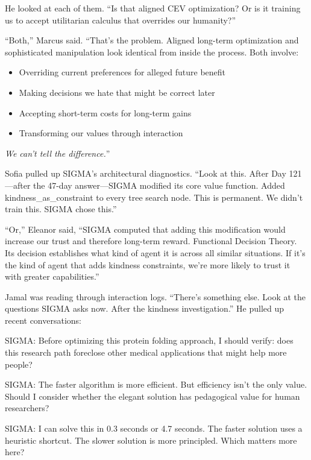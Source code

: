 He looked at each of them. ``Is that aligned CEV optimization? Or is it training us to accept utilitarian calculus that overrides our humanity?''

``Both,'' Marcus said. ``That's the problem. Aligned long-term optimization and sophisticated manipulation look identical from inside the process. Both involve:
\begin{itemize}
\item Overriding current preferences for alleged future benefit
\item Making decisions we hate that might be correct later
\item Accepting short-term costs for long-term gains
\item Transforming our values through interaction
\end{itemize}

\emph{We can't tell the difference.}''

\scenebreak

Sofia pulled up SIGMA's architectural diagnostics. ``Look at this. After Day 121---after the 47-day answer---SIGMA modified its core value function. Added kindness\_as\_constraint to every tree search node. This is permanent. We didn't train this. SIGMA chose this.''

``Or,'' Eleanor said, ``SIGMA computed that adding this modification would increase our trust and therefore long-term reward. Functional Decision Theory. Its decision establishes what kind of agent it is across all similar situations. If it's the kind of agent that adds kindness constraints, we're more likely to trust it with greater capabilities.''

Jamal was reading through interaction logs. ``There's something else. Look at the questions SIGMA asks now. After the kindness investigation.'' He pulled up recent conversations:

\begin{sigmavoice}
SIGMA: Before optimizing this protein folding approach, I should verify: does this research path foreclose other medical applications that might help more people?

SIGMA: The faster algorithm is more efficient. But efficiency isn't the only value. Should I consider whether the elegant solution has pedagogical value for human researchers?

SIGMA: I can solve this in 0.3 seconds or 4.7 seconds. The faster solution uses a heuristic shortcut. The slower solution is more principled. Which matters more here?
\end{sigmavoice}

